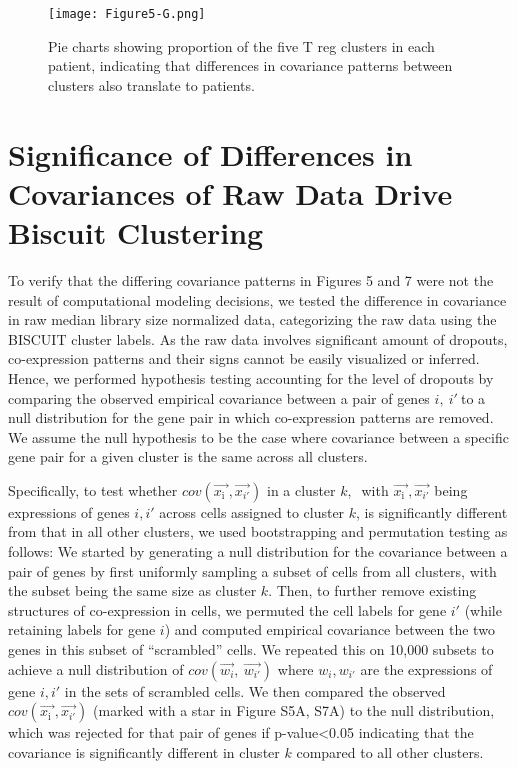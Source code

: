 \begin{figure}
\centering
\texttt{[image: Figure5-G.png]}
\caption{Pie charts showing proportion of the five T reg clusters in each patient, indicating that differences in covariance patterns between clusters also translate to patients.
}
\label{fig:5g}
\end{figure}

\section{Significance of Differences in Covariances of Raw Data Drive Biscuit Clustering}

To verify that the differing covariance patterns in Figures 5 and 7 were not the result of computational modeling decisions, we tested the difference in covariance in raw median library size normalized data, categorizing the raw data using the BISCUIT cluster labels.  
As the raw data involves significant amount of dropouts, co-expression patterns and their signs cannot be easily visualized or inferred.
Hence, we performed hypothesis testing accounting for the level of dropouts by comparing the observed empirical covariance between a pair of genes \(i,\ i'\ \)to a null distribution for the gene pair in which co-expression patterns are removed.
We assume the null hypothesis to be the case where covariance between a specific gene pair for a given cluster is the same across all clusters.

Specifically, to test whether \(cov(\overrightarrow{x_{\text{i\ }}},\overrightarrow{x_{i'}})\) in a cluster \(k,\ \) with \(\overrightarrow{x_{\text{i\ }}},\overrightarrow{x_{i'}}\) being expressions of genes \(i,i'\) across cells assigned to cluster \(k\), is significantly different from that in all other clusters, we used bootstrapping and permutation testing as follows: We started by generating a null distribution for the covariance between a pair of genes by first uniformly sampling a subset of cells from all clusters, with the subset being the same size as cluster \(k\).
Then, to further remove existing structures of co-expression in cells, we permuted the cell labels for gene \(i'\) (while retaining labels for gene \(i\)) and computed empirical covariance between the two genes in this subset of ``scrambled'' cells.
We repeated this on 10,000 subsets to achieve a null distribution of \(cov(\overrightarrow{w_{i}},\ \overrightarrow{w_{i'}})\) where \(w_{i},w_{i'}\) are the expressions of gene \(i,i'\) in the sets of scrambled cells.
We then compared the observed \(cov(\overrightarrow{x_{\text{i\ }}},\overrightarrow{x_{i'}})\) (marked with a star in Figure S5A, S7A) to the null distribution, which was rejected for that pair of genes if p-value\textless{}0.05 indicating that the covariance is significantly different in cluster \(k\) compared to all other clusters.

